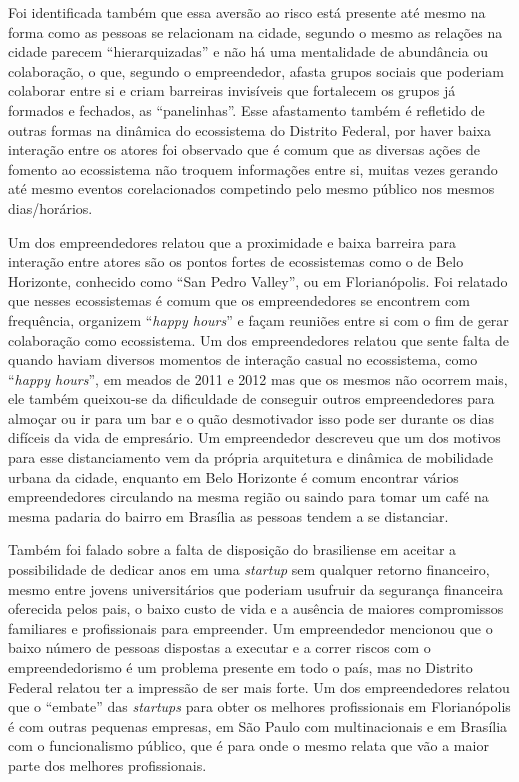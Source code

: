 Foi identificada também que essa aversão ao risco está presente até mesmo na forma como as pessoas se relacionam na cidade, segundo o mesmo as relações na cidade parecem ``hierarquizadas'' e não há uma mentalidade de abundância ou colaboração, o que, segundo o empreendedor, afasta grupos sociais que poderiam colaborar entre si e criam barreiras invisíveis que fortalecem os grupos já formados e fechados, as ``panelinhas''. Esse afastamento também é refletido de outras formas na dinâmica do ecossistema do Distrito Federal, por haver baixa interação entre os atores foi observado que é comum que as diversas ações de fomento ao ecossistema não troquem informações entre si, muitas vezes gerando até mesmo eventos corelacionados competindo pelo mesmo público nos mesmos dias/horários.

Um dos empreendedores relatou que a proximidade e baixa barreira para interação entre atores são os pontos fortes de ecossistemas como o de Belo Horizonte, conhecido como ``San Pedro Valley'', ou em Florianópolis. Foi relatado que nesses ecossistemas é comum que os empreendedores se encontrem com frequência, organizem ``\textit{happy hours}'' e façam reuniões entre si com o fim de gerar colaboração como ecossistema. Um dos empreendedores relatou que sente falta de quando haviam diversos momentos de interação casual no ecossistema, como ``\textit{happy hours}'', em meados de 2011 e 2012 mas que os mesmos não ocorrem mais, ele também queixou-se da dificuldade de conseguir outros empreendedores para almoçar ou ir para um bar e o quão desmotivador isso pode ser durante os dias difíceis da vida de empresário. Um empreendedor descreveu que um dos motivos para esse distanciamento vem da própria arquitetura e dinâmica de mobilidade urbana da cidade, enquanto em Belo Horizonte é comum encontrar vários empreendedores circulando na mesma região ou saindo para tomar um café na mesma padaria do bairro em Brasília as pessoas tendem a se distanciar.

Também foi falado sobre a falta de disposição do brasiliense em aceitar a possibilidade de dedicar anos em uma \textit{startup} sem qualquer retorno financeiro, mesmo entre jovens universitários que poderiam usufruir da segurança financeira oferecida pelos pais, o baixo custo de vida e a ausência de maiores compromissos familiares e profissionais para empreender. Um empreendedor mencionou que o baixo número de pessoas dispostas a executar e a correr riscos com o empreendedorismo é um problema presente em todo o país, mas no Distrito Federal relatou ter a impressão de ser mais forte. Um dos empreendedores relatou que o ``embate'' das \textit{startups} para obter os melhores profissionais em Florianópolis é com outras pequenas empresas, em São Paulo com multinacionais e em Brasília com o funcionalismo público, que é para onde o mesmo relata que vão a maior parte dos melhores profissionais.

